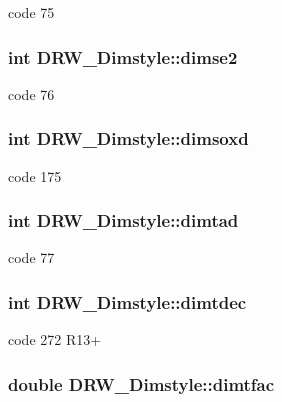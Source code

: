 code 75 \hypertarget{classDRW__Dimstyle_a216852cf21ff08714ec7ce33085a7d76}{
\subsubsection[{dimse2}]{\setlength{\rightskip}{0pt plus 5cm}int D\-R\-W\-\_\-\-Dimstyle\-::dimse2}}\label{classDRW__Dimstyle_a216852cf21ff08714ec7ce33085a7d76}
code 76 \hypertarget{classDRW__Dimstyle_aeb06ebd1bd16306b336032f4b8c4a80a}{
\subsubsection[{dimsoxd}]{\setlength{\rightskip}{0pt plus 5cm}int D\-R\-W\-\_\-\-Dimstyle\-::dimsoxd}}\label{classDRW__Dimstyle_aeb06ebd1bd16306b336032f4b8c4a80a}
code 175 \hypertarget{classDRW__Dimstyle_a5d98411bf63dd31343050ee3b17778ef}{
\subsubsection[{dimtad}]{\setlength{\rightskip}{0pt plus 5cm}int D\-R\-W\-\_\-\-Dimstyle\-::dimtad}}\label{classDRW__Dimstyle_a5d98411bf63dd31343050ee3b17778ef}
code 77 \hypertarget{classDRW__Dimstyle_adf05a8cee69d5a24cff03bccb74fdaf0}{
\subsubsection[{dimtdec}]{\setlength{\rightskip}{0pt plus 5cm}int D\-R\-W\-\_\-\-Dimstyle\-::dimtdec}}\label{classDRW__Dimstyle_adf05a8cee69d5a24cff03bccb74fdaf0}
code 272 R13+ \hypertarget{classDRW__Dimstyle_af90d8887451dfd6c127d27baa014735a}{
\subsubsection[{dimtfac}]{\setlength{\rightskip}{0pt plus 5cm}double D\-R\-W\-\_\-\-Dimstyle\-::dimtfac}}\label{classDRW__Dimstyle_af90d8887451dfd6c127d27baa014735a}
